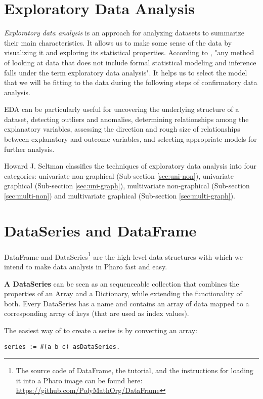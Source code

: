 \documentclass[sigplan]{acmart}
\begin{document}
\section{Exploratory Data Analysis}
\label{sec:eda}
\textit{Exploratory data analysis} is an approach for analyzing datasets to summarize their main characteristics. It allows us to make some sense of the data by visualizing it and exploring its statistical properties.
According to \cite{Seltman}, "any method of looking at data that does not include formal statistical modeling and inference falls under the term exploratory data analysis". It helps us to select the model that we will be fitting to the data during the following steps of confirmatory data analysis.

EDA can be particularly useful for uncovering the underlying structure of a dataset, detecting outliers and anomalies, determining relationships among the explanatory variables, assessing the direction and rough size of relationships between explanatory and outcome variables, and selecting appropriate models for further analysis\cite{eStats}.

Howard J. Seltman \cite{Seltman} classifies the techniques of exploratory data analysis into four categories: univariate non-graphical (Sub-section \ref{sec:uni-non}), univariate graphical (Sub-section \ref{sec:uni-graph}), multivariate non-graphical (Sub-section \ref{sec:multi-non}) and multivariate graphical (Sub-section \ref{sec:multi-graph}).

\section{DataSeries and DataFrame}
\label{sec:dataframe}
DataFrame and DataSeries\footnote{The source code of DataFrame, the tutorial, and the instructions for loading it into a Pharo image can be found here: \url{https://github.com/PolyMathOrg/DataFrame}} are the high-level data structures with which we intend to make data analysis in Pharo fast and easy.%

\textbf{A DataSeries} can be seen as an sequenceable collection that combines the properties of an Array and a Dictionary, while extending the functionality of both. Every DataSeries has a name and contains an array of data mapped to a corresponding array of keys (that are used as index values).

The easiest way of to create a series is by converting an array: 

\begin{lstlisting}[basicstyle=\small,language=Smalltalk]
series := #(a b c) asDataSeries.
\end{lstlisting}
\end{document}
